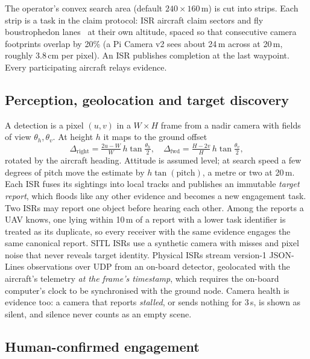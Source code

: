 \documentclass[conference]{IEEEtran}
\begin{document}
The operator's convex search area (default $240\times160$\,m) is cut into
strips. Each strip is a task in the claim protocol: ISR aircraft claim sectors
and fly boustrophedon lanes~\cite{choset2000boustrophedon} at their own
altitude, spaced so that consecutive camera footprints overlap by 20\% (a Pi
Camera v2 sees about 24\,m across at 20\,m, roughly 3.8\,cm per pixel). An ISR
publishes completion at the last waypoint. Every participating aircraft
relays evidence.

\subsection{Perception, geolocation and target discovery}

A detection is a pixel $(u,v)$ in a $W\times H$ frame from a nadir camera with
fields of view $\theta_h,\theta_v$. At height $h$ it maps to the ground offset
\begin{equation}
  \Delta_{\mathrm{right}} = \tfrac{2u-W}{W}\,h\tan\tfrac{\theta_h}{2},\quad
  \Delta_{\mathrm{fwd}} = \tfrac{H-2v}{H}\,h\tan\tfrac{\theta_v}{2},
\end{equation}
rotated by the aircraft heading. Attitude is assumed level; at search speed a
few degrees of pitch move the estimate by $h\tan(\text{pitch})$, a metre or
two at 20\,m. Each ISR fuses its sightings into local tracks and publishes an
immutable \emph{target report}, which floods like any other evidence and
becomes a new engagement task. Two ISRs may report one object before hearing
each other. Among the reports a UAV knows, one lying within 10\,m of a report
with a lower task identifier is treated as its duplicate, so every receiver
with the same evidence engages the same canonical report. SITL ISRs use a
synthetic camera with misses and pixel noise that never reveals target
identity. Physical ISRs stream version-1 JSON-Lines observations over UDP from
an on-board detector, geolocated with the aircraft's telemetry \emph{at the
frame's timestamp}, which requires the on-board computer's clock to be
synchronised with the ground node. Camera health is evidence too: a camera that reports
\emph{stalled}, or sends nothing for 3\,s, is shown as silent, and silence
never counts as an empty scene.

\subsection{Human-confirmed engagement}
\label{sec:engage}
\end{document}

